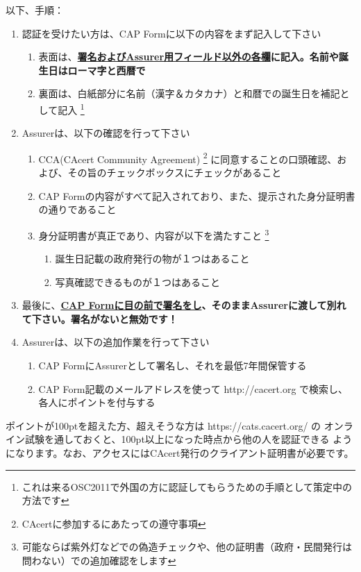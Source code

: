 \documentclass[mingoth,a4paper]{jsarticle}
\begin{document}
以下、手順：
\begin{enumerate}

\item 認証を受けたい方は、CAP Formに以下の内容をまず記入して下さい
\begin{enumerate}
\item 表面は、\bf{\underline{署名およびAssurer用フィールド以外の各欄}}に記入。名前や誕生日はローマ字と西暦で
\item 裏面は、白紙部分に名前（漢字＆カタカナ）と和暦での誕生日を補記として記入
\footnote{これは来るOSC2011で外国の方に認証してもらうための手順として策定中の方法です}
\end{enumerate}

\item Assurerは、以下の確認を行って下さい
\begin{enumerate}
\item CCA(CAcert Community Agreement)
\footnote{CAcertに参加するにあたっての遵守事項}
に同意することの口頭確認、および、その旨のチェックボックスにチェックがあること
\item CAP Formの内容がすべて記入されており、また、提示された身分証明書の通りであること
\item 身分証明書が真正であり、内容が以下を満たすこと
\footnote{可能ならば紫外灯などでの偽造チェックや、他の証明書（政府・民間発行は問わない）での追加確認をします}
\begin{enumerate}
\item 誕生日記載の政府発行の物が１つはあること
\item 写真確認できるものが１つはあること
\end{enumerate}
\end{enumerate}

\item 最後に、\bf{\underline{CAP Formに目の前で署名をし}}、そのままAssurerに渡して別れて下さい。署名がないと無効です！

\item Assurerは、以下の追加作業を行って下さい
\begin{enumerate}
\item CAP FormにAssurerとして署名し、それを最低7年間保管する
\item CAP Form記載のメールアドレスを使って http://cacert.org で検索し、各人にポイントを付与する
\end{enumerate}

\end{enumerate}

ポイントが100ptを超えた方、超えそうな方は https://cats.cacert.org/ の
オンライン試験を通しておくと、100pt以上になった時点から他の人を認証できる
ようになります。なお、アクセスにはCAcert発行のクライアント証明書が必要です。
\end{document}

